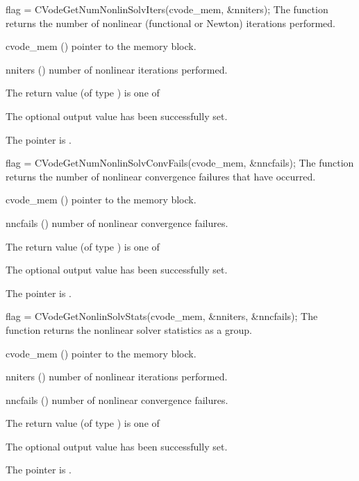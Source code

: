 {}
{
  flag = CVodeGetNumNonlinSolvIters(cvode\_mem, \&nniters);
}
{
  The function  returns the
  number of nonlinear (functional or Newton) iterations performed. 
}
{
  \begin{args}
  \item[cvode\_mem] ()
    pointer to the {\cvode} memory block.
  \item[nniters] ()
    number of nonlinear iterations performed.
  \end{args}
}
{
  The return value  (of type ) is one of
  \begin{args}
  \item[\Id{CV\_SUCCESS}] 
    The optional output value has been successfully set.
  \item[\Id{CV\_MEM\_NULL}]
    The  pointer is .
  \end{args}
}
{}
{
  flag = CVodeGetNumNonlinSolvConvFails(cvode\_mem, \&nncfails);
}
{
  The function  returns the
  number of nonlinear convergence failures that have occurred.
}
{
  \begin{args}
  \item[cvode\_mem] ()
    pointer to the {\cvode} memory block.
  \item[nncfails] ()
    number of nonlinear convergence failures.
  \end{args}
}
{
  The return value  (of type ) is one of
  \begin{args}
  \item[\Id{CV\_SUCCESS}] 
    The optional output value has been successfully set.
  \item[\Id{CV\_MEM\_NULL}]
    The  pointer is .
  \end{args}
}
{}
{
  flag = CVodeGetNonlinSolvStats(cvode\_mem, \&nniters, \&nncfails);
}
{
  The function  returns the
  {\cvode} nonlinear solver statistics as a group.
}
{
  \begin{args}
  \item[cvode\_mem] ()
    pointer to the {\cvode} memory block.
  \item[nniters] ()
    number of nonlinear iterations performed.
  \item[nncfails] ()
    number of nonlinear convergence failures.
  \end{args}
}
{
  The return value  (of type ) is one of
  \begin{args}
  \item[\Id{CV\_SUCCESS}] 
    The optional output value has been successfully set.
  \item[\Id{CV\_MEM\_NULL}]
    The  pointer is .
  \end{args}
}
{}

